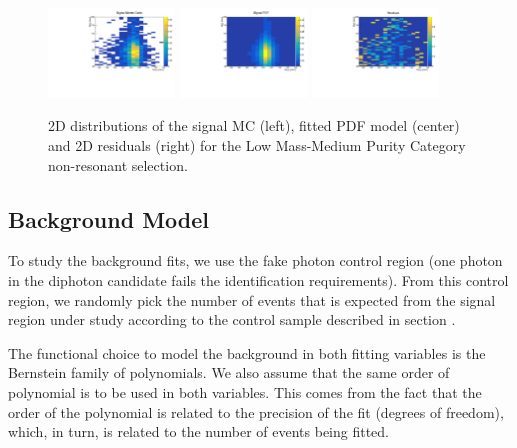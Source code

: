 \begin{figure}[h]
  \centering
\includegraphics[width=0.3\textwidth]{figures/sec-signals/SignalResiduals/h_mc_LM_cat1}\hfil
\includegraphics[width=0.3\textwidth]{figures/sec-signals/SignalResiduals/h_pd_LM_cat1}\hfil
\includegraphics[width=0.3\textwidth]{figures/sec-signals/SignalResiduals/h_re_LM_cat1}\hfil
  \caption{2D distributions of the signal MC (left), fitted PDF model (center) and 2D residuals (right) for the Low Mass-Medium Purity Category non-resonant selection.}
  \label{fig:sig_resi_lm_mpc}
\end{figure}



\subsection{Background Model}

To study the background fits, we use the fake photon control region (one photon in the diphoton candidate fails the identification requirements). From this control region, we randomly pick the number of events that is expected from the signal region under study according to the control sample described in section \label{sec:PCR}.

The functional choice to model the background in both fitting variables is the Bernstein family of polynomials. 
We also assume that the same order of polynomial is to be used in both variables. 
This comes from the fact that the order of the polynomial is related to the precision of the fit (degrees of freedom), which, in turn, is related to the number of events being fitted. 

